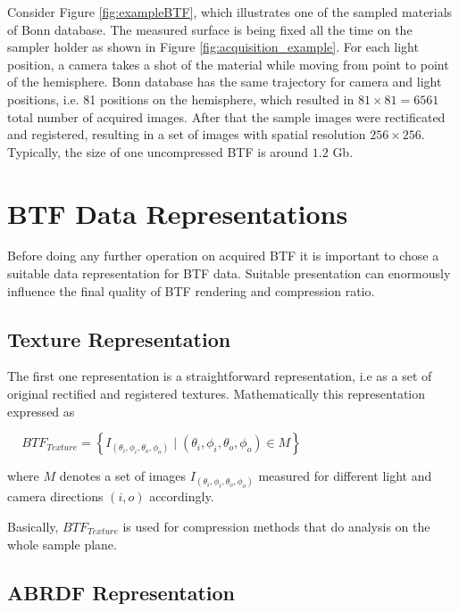  Consider Figure \ref{fig:exampleBTF}, which illustrates one of the sampled materials of Bonn database.
The measured surface is being fixed all the time on the sampler holder as shown in Figure \ref{fig:acquisition_example}. For each light position, a camera takes a shot of the material while moving from point to point of the hemisphere.
Bonn database has the same trajectory for camera and light positions, i.e. 81 positions on the hemisphere, which resulted in $81\times81=6561$ total number of acquired images.
After that the sample images were rectificated and registered, resulting in a set of images with spatial resolution $256\times256$.
Typically, the size of one uncompressed BTF is around $1.2$ Gb.



\section{BTF Data Representations}
\label{chapter:representations}




Before doing any further operation on acquired BTF it is important to chose a suitable data representation for BTF data.
Suitable presentation can enormously influence the final quality of BTF rendering and compression ratio.
\subsection{Texture Representation}
\label{chapter:texture_repr}

 The first one representation is a straightforward representation, i.e as a set of original rectified and registered textures.
Mathematically this representation expressed as

{\centering $\,\,\,\,\,\,\,BTF_{Texture}=\left \{I_{(\theta_{i} ,\phi_{i},\theta_{o} ,\phi_{o}) }  \mid  (\theta_{i},\phi_{i},\theta_{o} ,\phi_{o})\in M \right \}$\\}


where $M$ denotes a set of images $I_{(\theta_{i} ,\phi_{i},\theta_{o} ,\phi_{o})}$ measured for different light and camera directions $(i,o)$ accordingly.

Basically, $BTF_{Texture}$ is used for compression methods that do analysis on the whole sample plane.

\subsection{ABRDF Representation}
\label{chapter:abrdf_repr}


